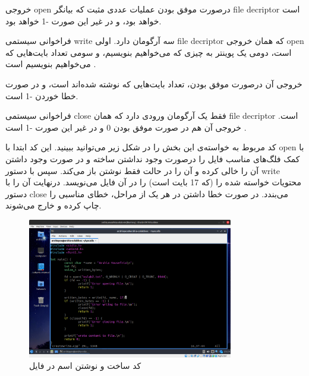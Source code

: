 \documentclass[12pt]{article}
\begin{document}
\begin{itemize}
        خروجی 
        \textenglish{open}
        درصورت موفق بودن عملیات 
        عددی مثبت که بیانگر
        \textenglish{file decriptor}
        است خواهد بود، و در غیر این صورت
        \textenglish{-1}
        خواهد بود.

        فراخوانی سیستمی
        \textenglish{write}
        سه آرگومان دارد. اولی 
        \textenglish{file decriptor}
        که همان خروجی
        \textenglish{open}
        است، دومی یک پوینتر به چیزی که می‌خواهیم بنویسیم، و سومی تعداد بایت‌هایی که می‌خواهیم بنویسیم است 
        \cite{linux-man-write}
        .

        خروجی آن درصورت موفق بودن، تعداد بایت‌هایی که نوشته‌ شده‌اند است، و در صورت خطا خوردن 
        \textenglish{-1}
        است.

        فراخوانی سیستمی 
        \textenglish{close}
        فقط یک آرگومان ورودی دارد که همان
        \textenglish{file decriptor}
        است. خروجی آن هم در صورت موفق بودن 
        \textenglish{0}
        و در غیر این صورت
        \textenglish{-1}
        است
        \cite{linux-man-close}
        .

        کد مربوط به خواسته‌ی این بخش را در شکل زیر می‌توانید ببینید. این کد ابتدا با 
        \textenglish{open}
        با کمک فلگ‌های مناسب
        فایل را درصورت وجود نداشتن ساخته و در صورت وجود داشتن آن را خالی کرده و آن را در حالت فقط نوشتن باز می‌کند. سپس با دستور
        \textenglish{write}
        محتویات خواسته شده را (که 17 بایت است) را در آن فایل می‌نویسد. درنهایت آن را با دستور
        \textenglish{close}
        می‌بندد. در صورت خطا داشتن در هر یک از مراحل، خطای مناسبی را چاپ کرده و خارج می‌شوند.

        \begin{figure}[H]
		\centering
		\includegraphics[width=0.8\textwidth]{report2-resources/9.png}
		\caption{کد ساخت و نوشتن اسم در فایل}
	\end{figure}


\end{itemize}
\end{document}

